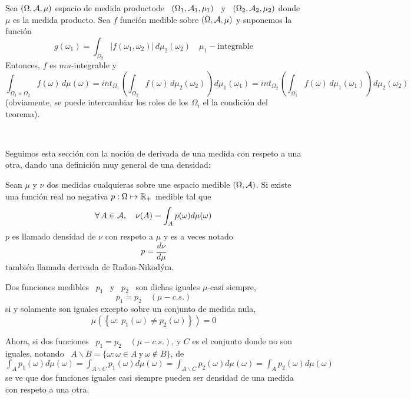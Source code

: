 {\begin{teorema}\label{Th:MP:Fubini}
  Sea $(\Omega,\mathcal{A},\mu)$ espacio de medida productode \ $(\Omega_1, \mathcal{A}_1, \mu_1)$
  \ y  \ $(\Omega_2, \mathcal{A}_2,  \mu_2)$ donde $\mu$  es la medida producto.  Sea $f$
  funci\'on medible sobre $(\Omega,\mathcal{A},\mu)$ y suponemos la funci\'on
  \[
  g(\omega_1)   =  \int_{\Omega_2}   \left|   f(\omega_1,\omega_2)  \right|   \,
  d\mu_2(\omega_2) \quad \mu_1-\mbox{integrable}
  \]
  Entonces, $f$ es $mu$-integrable y
  \[
  \int_{\Omega_1  \times \Omega_2}  f(\omega) \,  d\mu(\omega)  = int_{\Omega_1}
  \left(    \int_{\Omega_2}   f(\omega)    \,   d\mu_2(\omega_2)    \right)   \,
  d\mu_1(\omega_1)   =  int_{\Omega_2}   \left(  \int_{\Omega_1}   f(\omega)  \,
    d\mu_1(\omega_1) \right) \, d\mu_2(\omega_2)
  \]
  (obviamente, se puede intercambiar los roles de los $\Omega_i$ el la condici\'on del teorema).
\end{teorema}
  }

\

Seguimos esta secci\'on con la noci\'on  de derivada de una medida con respeto a
una otra, dando una definici\'on muy general de una densidad:
%
\begin{definicion}\label{def:MP:DensidadMedida}
  Sean  $\mu$  y  $\nu$  dos  medidas  cualquieras  sobre  une  espacio  medible
  $(\Omega,\mathcal{A})$.  Si  existe una funci\'on  real no negativa $p:  \Omega \mapsto
  \mathbb{R}_+$ medible tal que
  \[
  \forall \, A \in \mathcal{A}, \quad \nu(A) = \int_A p(\omega) d\mu(\omega)
  \]
  $p$ es llamado densidad de $\nu$ con respeto a $\mu$ y es a veces notado
  \[
  p = \frac{d\nu}{d\mu}
  \]
  tambi\'en llamada derivada de Radon-Nikod\'ym.
\end{definicion}

%
\begin{definicion}
  Dos funciones  medibles \ $p_1$  \ y \  $p_2$ \ son dichas  iguales $\mu$-casi
  siempre,
  \[
  p_1 = p_2 \quad (\mu-c.s.)
  \]
  si y solamente son iguales excepto sobre un conjunto de medida nula,
  \[
  \mu\left( \left\{ \omega: \: p_1(\omega) \ne p_2(\omega) \right\} \right) = 0
  \]
\end{definicion}
%
\noindent Ahora, si  dos funciones \ $p_1  = p_2 \quad (\mu-c.s.)$, y  $C$ es el
conjunto donde no son iguales, notando \ $A \backslash B = \{ \omega: \omega \in
A \:  \mbox{y} \:  \omega \not\in B\}$,  de \ $\displaystyle  \int_A p_1(\omega)
d\mu(\omega) = \int_{A\backslash C} p_1(\omega) d\mu(\omega) = \int_{A\backslash
  C} p_2(\omega) d\mu(\omega)  = \int_A p_2(\omega) d\mu(\omega)$ se  ve que dos
funciones iguales casi  siempre pueden ser densidad de una  medida con respeto a
una otra.

